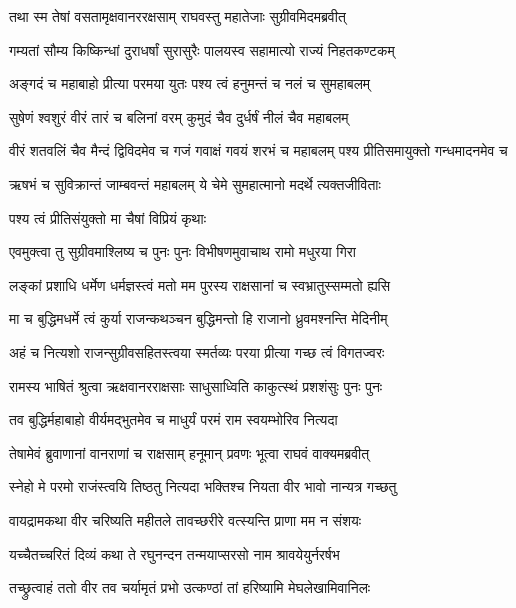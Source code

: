 
\twolineshloka
{तथा स्म तेषां वसतामृक्षवानररक्षसाम्}
{राघवस्तु महातेजाः सुग्रीवमिदमब्रवीत्} %

\twolineshloka
{गम्यतां सौम्य किष्किन्धां दुराधर्षां सुरासुरैः}
{पालयस्व सहामात्यो राज्यं निहतकण्टकम्} %

\twolineshloka
{अङ्गदं च महाबाहो प्रीत्या परमया युतः}
{पश्य त्वं हनुमन्तं च नलं च सुमहाबलम्} %

\twolineshloka
{सुषेणं श्वशुरं वीरं तारं च बलिनां वरम्}
{कुमुदं चैव दुर्धर्षं नीलं चैव महाबलम्} %

\threelineshloka
{वीरं शतवलिं चैव मैन्दं द्विविदमेव च}
{गजं गवाक्षं गवयं शरभं च महाबलम्}
{पश्य प्रीतिसमायुक्तो गन्धमादनमेव च} %

\twolineshloka
{ऋषभं च सुविक्रान्तं जाम्बवन्तं महाबलम्}
{ये चेमे सुमहात्मानो मदर्थे त्यक्तजीविताः} %

\onelineshloka
{पश्य त्वं प्रीतिसंयुक्तो मा चैषां विप्रियं कृथाः} %

\twolineshloka
{एवमुक्त्वा तु सुग्रीवमाश्लिष्य च पुनः पुनः}
{विभीषणमुवाचाथ रामो मधुरया गिरा} %

\twolineshloka
{लङ्कां प्रशाधि धर्मेण धर्मज्ञस्त्वं मतो मम}
{पुरस्य राक्षसानां च स्वभ्रातुस्सम्मतो ह्यसि} %

\twolineshloka
{मा च बुद्धिमधर्मे त्वं कुर्या राजन्कथञ्चन}
{बुद्धिमन्तो हि राजानो ध्रुवमश्नन्ति मेदिनीम्} %

\twolineshloka
{अहं च नित्यशो राजन्सुग्रीवसहितस्त्वया}
{स्मर्तव्यः परया प्रीत्या गच्छ त्वं विगतज्वरः} %

\twolineshloka
{रामस्य भाषितं श्रुत्वा ऋक्षवानरराक्षसाः}
{साधुसाध्विति काकुत्स्थं प्रशशंसुः पुनः पुनः} %

\twolineshloka
{तव बुद्धिर्महाबाहो वीर्यमद्भुतमेव च}
{माधुर्यं परमं राम स्वयम्भोरिव नित्यदा} %

\twolineshloka
{तेषामेवं ब्रुवाणानां वानराणां च राक्षसाम्}
{हनूमान् प्रवणः भूत्वा राघवं वाक्यमब्रवीत्} %

\twolineshloka
{स्नेहो मे परमो राजंस्त्वयि तिष्ठतु नित्यदा}
{भक्तिश्च नियता वीर भावो नान्यत्र गच्छतु} %

\twolineshloka
{वायद्रामकथा वीर चरिष्यति महीतले}
{तावच्छरीरे वत्स्यन्ति प्राणा मम न संशयः} %

\twolineshloka
{यच्चैतच्चरितं दिव्यं कथा ते रघुनन्दन}
{तन्मयाप्सरसो नाम श्रावयेयुर्नरर्षभ} %

\twolineshloka
{तच्छ्रुत्वाहं ततो वीर तव चर्यामृतं प्रभो}
{उत्कण्ठां तां हरिष्यामि मेघलेखामिवानिलः} %

